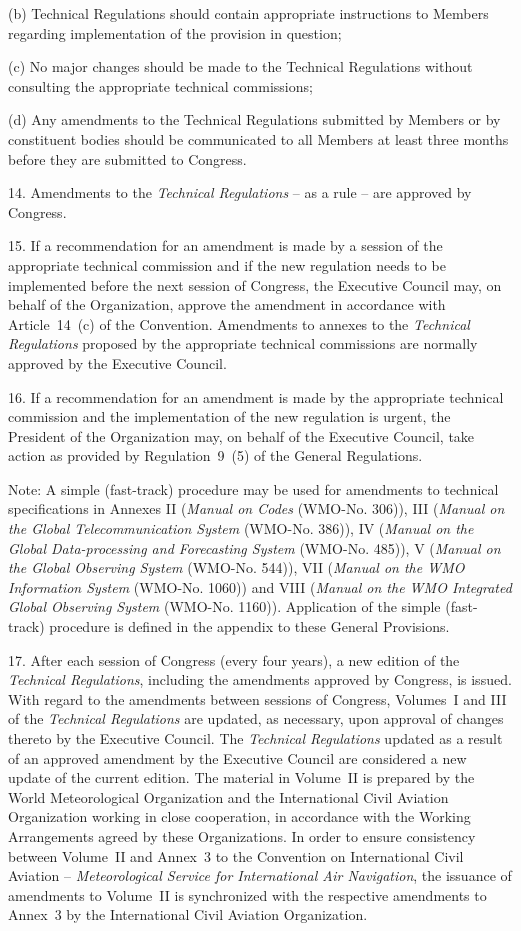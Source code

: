 (b) Technical Regulations should contain appropriate instructions to Members regarding implementation of the provision in question;

(c) No major changes should be made to the Technical Regulations without consulting the appropriate technical commissions;

(d) Any amendments to the Technical Regulations submitted by Members or by constituent bodies should be communicated to all Members at least three months before they are submitted to Congress.

14. Amendments to the \emph{Technical Regulations} -- as a rule -- are approved by Congress.

15. If a recommendation for an amendment is made by a session of the appropriate technical commission and if the new regulation needs to be implemented before the next session of Congress, the Executive Council may, on behalf of the Organization, approve the amendment in accordance with Article~14~(c) of the Convention. Amendments to annexes to the \emph{Technical Regulations} proposed by the appropriate technical commissions are normally approved by the Executive Council.

16. If a recommendation for an amendment is made by the appropriate technical commission and the implementation of the new regulation is urgent, the President of the Organization may, on behalf of the Executive Council, take action as provided by Regulation~9~(5) of the General Regulations.

Note: A simple (fast-track) procedure may be used for amendments to technical specifications in Annexes II (\emph{Manual on Codes} (WMO-No. 306)), III (\emph{Manual on the Global Telecommunication System} (WMO-No. 386)), IV (\emph{Manual on the Global Data-processing and Forecasting System} (WMO-No. 485)), V (\emph{Manual on the Global Observing System} (WMO-No. 544)), VII (\emph{Manual on the WMO Information System} (WMO-No. 1060)) and VIII (\emph{Manual on the WMO Integrated Global Observing System} (WMO-No. 1160)). Application of the simple (fast-track) procedure is defined in the appendix to these General Provisions.

17. After each session of Congress (every four years), a new edition of the \emph{Technical Regulations}, including the amendments approved by Congress, is issued. With regard to the amendments between sessions of Congress, Volumes~I and III of the \emph{Technical Regulations} are updated, as necessary, upon approval of changes thereto by the Executive Council. The \emph{Technical Regulations} updated as a result of an approved amendment by the Executive Council are considered a new update of the current edition. The material in Volume~II is prepared by the World Meteorological Organization and the International Civil Aviation Organization working in close cooperation, in accordance with the Working Arrangements agreed by these Organizations. In order to ensure consistency between Volume~II and Annex~3 to the Convention on International Civil Aviation -- \emph{Meteorological Service for International Air Navigation}, the issuance of amendments to Volume~II is synchronized with the respective amendments to Annex~3 by the International Civil Aviation Organization.


